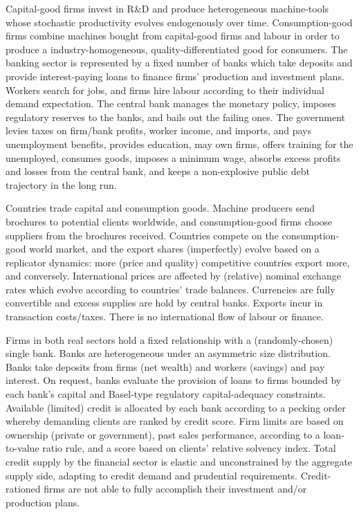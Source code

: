 \documentclass[a4paper,11pt]{article}
\begin{document}
Capital-good firms invest in R\&D and produce heterogeneous machine-tools whose stochastic productivity evolves endogenously over time. Consumption-good firms combine machines bought from capital-good firms and labour in order to produce a industry-homogeneous, quality-differentiated good for consumers. The banking sector is represented by a fixed number of banks which take deposits and provide interest-paying loans to finance firms' production and investment plans. Workers search for jobs, and firms hire labour according to their individual demand expectation. The central bank manages the monetary policy, imposes regulatory reserves to the banks, and bails out the failing ones. The government levies taxes on firm/bank profits, worker income, and imports, and pays unemployment benefits, provides education, may own firms, offers training for the unemployed, consumes goods, imposes a minimum wage, absorbs excess profits and losses from the central bank, and keeps a non-explosive public debt trajectory in the long run.

Countries trade capital and consumption goods. Machine producers send brochures to potential clients worldwide, and consumption-good firms choose suppliers from the brochures received. Countries compete on the consumption-good world market, and the export shares (imperfectly) evolve based on a replicator dynamics: more (price and quality) competitive countries export more, and conversely. International prices are affected by (relative) nominal exchange rates which evolve according to countries' trade balances. Currencies are fully convertible and excess supplies are hold by central banks. Exports incur in transaction costs/taxes. There is no international flow of labour or finance.

Firms in both real sectors hold a fixed relationship with a (randomly-chosen) single bank. Banks are heterogeneous under an asymmetric size distribution. Banks take deposits from firms (net wealth) and workers (savings) and pay interest. On request, banks evaluate the provision of loans to firms bounded by each bank's capital and Basel-type regulatory capital-adequacy constraints. Available (limited) credit is allocated by each bank according to a pecking order whereby demanding clients are ranked by credit score. Firm limits are based on ownership (private or government), past sales performance, according to a loan-to-value ratio rule, and a score based on clients' relative solvency index. Total credit supply by the financial sector is elastic and unconstrained by the aggregate supply side, adapting to credit demand and prudential requirements. Credit-rationed firms are not able to fully accomplish their investment and/or production plans.
\end{document}
